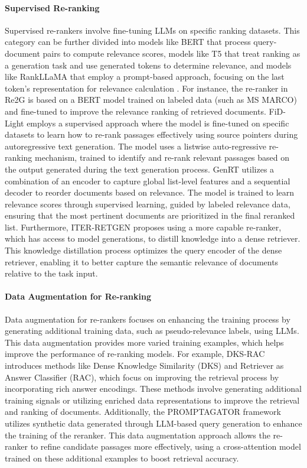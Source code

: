 \paragraph{Supervised Re-ranking} Supervised re-rankers involve fine-tuning LLMs on specific ranking datasets. This category can be further divided into models like BERT that process query-document pairs to compute relevance scores, models like T5 that treat ranking as a generation task and use generated tokens to determine relevance, and models like RankLLaMA \cite{ma2024finetuning} that employ a prompt-based approach, focusing on the last token's representation for relevance calculation \cite{zhu2023large}. For instance, the re-ranker in Re2G \cite{glass2022reg} is based on a BERT model trained on labeled data (such as MS MARCO) and fine-tuned to improve the relevance ranking of retrieved documents. FiD-Light \cite{hofstätter2023fidlight} employs a supervised approach where the model is fine-tuned on specific datasets to learn how to re-rank passages effectively using source pointers during autoregressive text generation. The model uses a listwise auto-regressive re-ranking mechanism, trained to identify and re-rank relevant passages based on the output generated during the text generation process. GenRT \cite{xu2024listaware} utilizes a combination of an encoder to capture global list-level features and a sequential decoder to reorder documents based on relevance. The model is trained to learn relevance scores through supervised learning, guided by labeled relevance data, ensuring that the most pertinent documents are prioritized in the final reranked list. Furthermore, ITER-RETGEN \cite{shao2023enhancing} proposes using a more capable re-ranker, which has access to model generations, to distill knowledge into a dense retriever. This knowledge distillation process optimizes the query encoder of the dense retriever, enabling it to better capture the semantic relevance of documents relative to the task input.

\paragraph{Data Augmentation for Re-ranking} Data augmentation for re-rankers focuses on enhancing the training process by generating additional training data, such as pseudo-relevance labels, using LLMs. This data augmentation provides more varied training examples, which helps improve the performance of re-ranking models. For example, DKS-RAC \cite{huang2023retrieval} introduces methods like Dense Knowledge Similarity (DKS) and Retriever as Answer Classifier (RAC), which focus on improving the retrieval process by incorporating rich answer encodings. These methods involve generating additional training signals or utilizing enriched data representations to improve the retrieval and ranking of documents. Additionally, the PROMPTAGATOR \cite{dai2023promptagator} framework utilizes synthetic data generated through LLM-based query generation to enhance the training of the reranker. This data augmentation approach allows the re-ranker to refine candidate passages more effectively, using a cross-attention model trained on these additional examples to boost retrieval accuracy.

